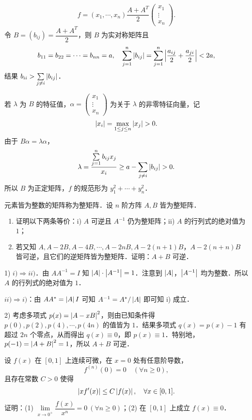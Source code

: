 \begin{solution}
\[
  f=(x_{1},\cdots,x_{n})\frac{A+A^{T}}{2}\begin{pmatrix}x_{1}\\ \vdots\\ x_{n}\end{pmatrix}.
\]
令 $B=(b_{ij})=\dfrac{A+A^{T}}{2}$，则 $B$ 为实对称矩阵且
\[
  b_{11}=b_{22}=\cdots=b_{nn}=a,\quad
  \sum_{j=1}^{n}\left|b_{ij}\right|=\sum_{j=1}^{n}\left|\frac{a_{ij}}{2}+\frac{a_{ji}}{2}\right|<2a,
\]
结果 $b_{ii}>\sum\limits_{j\ne i}\left|b_{ij}\right|$．

若 $\lambda$ 为 $B$ 的特征值，$\alpha=\begin{pmatrix}x_{1}\\ \vdots\\ x_{n}\end{pmatrix}$ 为关于 $\lambda$ 的非零特征向量，记
\[
  \abs{x_{i}}=\max_{1\le j\le n}\abs{x_{j}}>0.
\]
由于 $B\alpha=\lambda\alpha$，
\[
  \lambda=\frac{\sum\limits_{j=1}^{n}b_{ij}x_{j}}{x_{i}}\ge a-\sum_{j\ne i}\abs{b_{ij}}>0.
\]
所以 $B$ 为正定矩阵，$f$ 的规范形为 $y_{1}^{2}+\cdots+y_{n}^{2}$．
\end{solution}

元素皆为整数的矩阵称为整矩阵．设 $n$ 阶方阵 $A,B$ 皆为整矩阵．
\begin{enumerate}
  \item 证明以下两条等价：i) $A$ 可逆且 $A^{-1}$ 仍为整矩阵；ii) $A$ 的行列式的绝对值为 $1$；
  \item 若又知 $A,A-2B,A-4B,\cdots,A-2nB,A-2(n+1)B$，$A-2(n+n)B$ 皆可逆，且它们的逆矩阵皆为整矩阵．证明：$A+B$ 可逆．
\end{enumerate}

\begin{solution}
1) $i)\Rightarrow ii)$．由 $AA^{-1}=I$ 知 $\left|A\right|\cdot\left|A^{-1}\right|=1$．注意到 $\left|A\right|$，$\left|A^{-1}\right|$ 均为整数．所以 $A$ 的行列式的绝对值为 $1$．

$ii)\Rightarrow i)$：由 $AA^{*}=\left|A\right|I$ 可知 $A^{-1}=A^{*}/\left|A\right|$ 即可知 i) 成立．

2) 考虑多项式 $p(x)=\left|A-xB\right|^{2}$，则由已知条件得 $p(0),p(2),p(4),\cdots,p(4n)$ 的值皆为 $1$．结果多项式 $q(x)=p(x)-1$ 有超过 $2n$ 个零点，从而得出 $q(x)\equiv 0$，即 $p(x)\equiv 1$．特别地，$p(-1)=\left|A+B\right|^{2}=1$，所以 $A+B$ 可逆．
\end{solution}

设 $f(x)$ 在 $[0,1]$ 上连续可微，在 $x=0$ 处有任意阶导数，
\[
  f^{(n)}(0)=0\quad(\forall n\ge 0),
\]
且存在常数 $C>0$ 使得
\[
  \left|xf'(x)\right|\le C\left|f(x)\right|,\quad \forall x\in[0,1].
\]
证明：(1) $\lim\limits_{x\to 0^{+}}\dfrac{f(x)}{x^{n}}=0\ (\forall n\ge 0)$；(2) 在 $[0,1]$ 上成立 $f(x)\equiv 0$．

